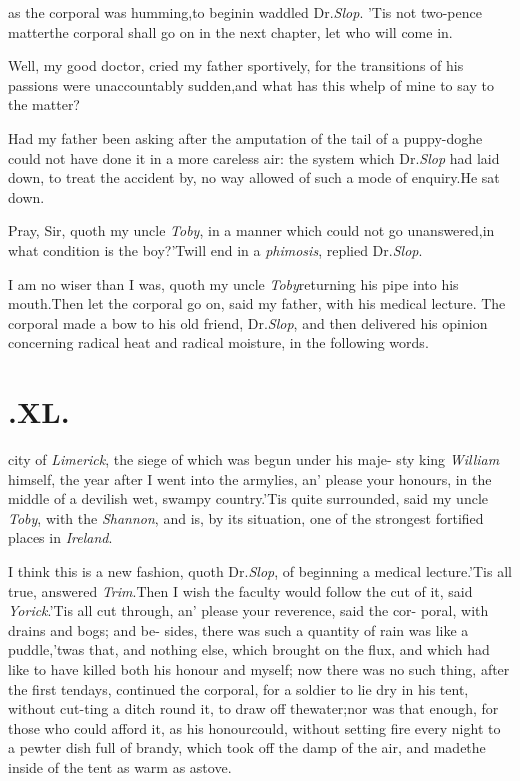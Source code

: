 \documentclass{article}
\begin{document}
 as the corporal was humming,\break to
begin\tsk in waddled Dr.\@ \textit{Slop}.\tsk\break
’Tis not two-pence matter\tsk the corporal shall go on in the next
chapter, let who will come in.\tsh

Well, my good doctor, cried my father sportively, for the
transitions of his passions were unaccountably sudden,\tsk and
what has this whelp of mine to say to the matter?\tsh

Had my father been asking after the amputation of the tail of a
puppy-dog\break\tsk he could not have done it in a more careless air:
the system which Dr.\@ \textit{Slop} had laid down, to treat the
accident by, no way allowed of such a mode of enquiry.\tsk He sat
down.

Pray, Sir, quoth my uncle \textit{Toby}, in a manner which could
not go unanswered,\break\tsk in what condition is the
boy?\tsk ’Twill end in a \textit{phimosis}, replied Dr.\@ \textit{Slop}.

I am no wiser than I was, quoth my uncle
\textit{Toby}\tsk returning his pipe into his
mouth.\tsh Then let the corporal go on,
said my father,
with his medical lecture.\break
\tsk The corporal made a bow to his old
friend, Dr.\@ \textit{Slop}, and then delivered his opinion concerning
radical heat and radical moisture, in the following words.

\section{.\enspace  XL.}

 city of \textit{Limerick}, the
siege of\break
which was begun under his maje-\break
sty king \textit{William}
himself, the year after I went into the army\tsk lies, an’
please your honours, in the middle of a devilish wet, swampy
country.\tsk ’Tis quite surrounded, said my uncle
\textit{Toby}, with the \textit{Shannon}, and is, by its situation, one
of the strongest fortified places in
\textit{Ireland}.\tsh

\eject
I think this is a new fashion, quoth Dr.\@ \textit{Slop}, of
beginning a medical lecture.\break\tsk ’Tis all true, answered
\textit{Trim}.\tsk Then\break 
I wish the faculty would follow the cut\break
of it, said \textit{Yorick}.\tsk ’Tis all cut through,\break
an’ please your reverence, said the cor-\break
poral, with drains and bogs; and be-\break
sides, there was such a quantity of rain\break 
{} was like a puddle,\tsh ’twas that, and
nothing else, which brought on the\break
flux, and which had like to have
killed both his honour and myself; now there was no such thing,
after the first ten\break days, continued the corporal, for a soldier to
lie dry in his tent, without cut-\break ting a ditch round it, to draw off
the\break water;\tsk nor was that enough, for those who could afford
it, as his honour\break could, without setting fire every night to a
pewter dish full of brandy, which took off the damp of the air, and
made\break the inside of the tent as warm as a\break stove.\tsh
\end{document}
